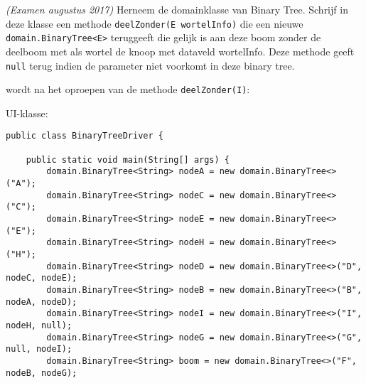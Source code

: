 \begin{oef}
\code \emph{(Examen augustus 2017)} Herneem de domainklasse van Binary Tree. Schrijf in deze klasse een methode \verb/deelZonder(E wortelInfo)/ die een nieuwe \verb+domain.BinaryTree<E>+ teruggeeft die gelijk is aan deze boom zonder de deelboom met als wortel de knoop met dataveld wortelInfo. Deze methode geeft \verb+null+ terug indien de parameter niet voorkomt in deze binary tree.

\begin{figure}[htbp]
    \centering
{}
\end{figure}

wordt na het oproepen van de methode \verb+deelZonder(I)+:
\begin{figure}[htbp]
    \centering
{}
\end{figure}

UI-klasse:
\begin{lstlisting}
public class BinaryTreeDriver {

    public static void main(String[] args) {
        domain.BinaryTree<String> nodeA = new domain.BinaryTree<>("A");
        domain.BinaryTree<String> nodeC = new domain.BinaryTree<>("C");
        domain.BinaryTree<String> nodeE = new domain.BinaryTree<>("E");
        domain.BinaryTree<String> nodeH = new domain.BinaryTree<>("H");
        domain.BinaryTree<String> nodeD = new domain.BinaryTree<>("D", nodeC, nodeE);
        domain.BinaryTree<String> nodeB = new domain.BinaryTree<>("B", nodeA, nodeD);
        domain.BinaryTree<String> nodeI = new domain.BinaryTree<>("I", nodeH, null);
        domain.BinaryTree<String> nodeG = new domain.BinaryTree<>("G", null, nodeI);
        domain.BinaryTree<String> boom = new domain.BinaryTree<>("F", nodeB, nodeG);


\end{lstlisting}
\end{oef}

